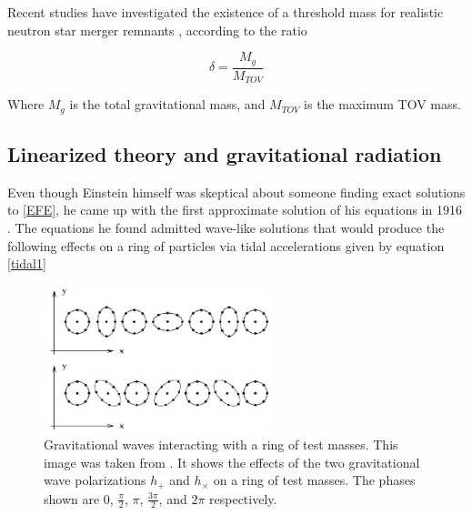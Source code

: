 Recent studies have investigated the existence of a threshold mass for realistic neutron star merger remnants \cite{Kashyap_2022}, according to the ratio

\begin{equation}\label{delta}
\delta=\frac{M_g}{M_{TOV}}
\end{equation} 

Where $M_g$ is the total gravitational mass, and $M_{TOV}$ is the maximum TOV mass.





\subsection{Linearized theory and gravitational radiation}\label{GW}

Even though Einstein himself was skeptical about someone finding exact solutions to \ref{EFE}, he came up with the first approximate solution of his equations in 1916 \cite{Einstein:1916cc}. The equations he found admitted wave-like solutions that would produce the following effects on a ring of particles via tidal accelerations given by equation \ref{tidal1}


\begin{figure}[hbt!]
\begin{center}
\includegraphics[width=0.6\textwidth, angle=0]{images/particle-ring.png}
\captionsetup{width=0.8\textwidth}
\caption[Gravitational waves interacting with a ring of test masses]{Gravitational waves interacting with a ring of test masses. This image was taken from \cite{carroll-notes}.  It shows the effects of the two gravitational wave polarizations $h_+$ and $h_\times$ on a ring of test masses. The phases shown are 0, $\frac{\pi}{2}$, $\pi$, $\frac{3\pi}{2}$, and $2\pi$ respectively.}
\label{GW passing through a ring of test masses}
\end{center}
\end{figure}

\FloatBarrier

